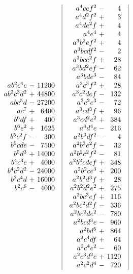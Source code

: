 \[\begin{array}{@{}c|c|c|c@{}}
\begin{array}{r@{\ }c@{\ }r}
ab^2c^4e&-&11200\\
ab^2c^3d^2&+&44800\\
abc^5d&-&27200\\
ac^7&+&6400\\
b^6df&+&400\\
b^6e^2&+&1625\\
b^5c^2f&-&300\\
b^5cde&-&7500\\
b^5d^3&+&14000\\
b^4c^3e&+&4000\\
b^4c^2d^2&-&24000\\
b^3c^4d&+&16000\\
b^2c^6&-&4000
\end{array}
&
\begin{array}{r@{\ }c@{\ }r}
a^4cef^2&-&4\\
a^4d^2f^2&+&3\\
a^4de^2f&+&4\\
a^4e^4&+&4\\
a^3b^2ef^2&+&4\\
a^3bcdf^2&-&2\\
a^3bce^2f&+&28\\
a^3bd^2ef&-&62\\
a^3bde^3&-&84\\
a^3c^3f^2&+&28\\
a^3c^2def&-&132\\
a^3c^2e^3&-&72\\
a^3cd^3f&+&96\\
a^3cd^2e^2&+&384\\
a^3d^4e&-&216\\
a^2b^3df^2&-&4\\
a^2b^3e^2f&-&32\\
a^2b^2c^2f^2&-&81\\
a^2b^2cdef&+&348\\
a^2b^2ce^3&+&200\\
a^2b^2d^3f&+&28\\
a^2b^2d^2e^2&+&275\\
a^2bc^3ef&+&116\\
a^2bc^2d^2f&-&336\\
a^2bc^2de^2&-&780\\
a^2bcd^3e&-&960\\
a^2bd^5&+&864\\
a^2c^4df&+&64\\
a^2c^4e^2&-&60\\
a^2c^3d^2e&+&1120\\
a^2c^2d^4&-&720\\

\end{array}
\end{array}\]
